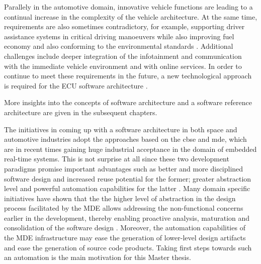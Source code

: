 Parallely in the automotive domain, innovative vehicle functions are leading to a continual increase in the complexity of the vehicle architecture. At the same time, requirements are also sometimes contradictory, for example, supporting driver assistance systems in critical driving manoeuvers while also improving fuel economy and also conforming to the environmental standards \cite{AUTOSARurl}. Additional challenges include deeper integration of the infotainment and communication with the immediate vehicle environment and with online services. In order to continue to meet these requirements in the future, a new technological approach is required for the ECU software architecture \cite{AUTOSARurl}.  

More insights into the concepts of software architecture and a software reference architecture are given in the subsequent chapters.     

The initiatives in coming up with a software architecture in both space and automotive industries adopt the approaches based on the \ac{cbse} and \ac{mde}, which are in recent times gaining huge industrial acceptance in the domain of embedded real-time systems. This is not surprise at all since these two development paradigms promise important advantages such as better and more disciplined software design and increased reuse potential for the former; greater abstraction level and powerful automation capabilities for the latter \cite{CBSE}\cite{PhdThesis}. Many domain specific initiatives have shown that the the higher level of abstraction in the design process facilitated by the MDE allows addressing the non-functional concerns earlier in the development, thereby enabling proactive analysis, maturation and consolidation of the software design \cite{CompBasedDev}. Moreover, the automation capabilities of the MDE infrastructure may ease the generation of lower-level design artifacts and ease the generation of source code products.
Taking first steps towards such an automation is the main motivation for this Master thesis.

